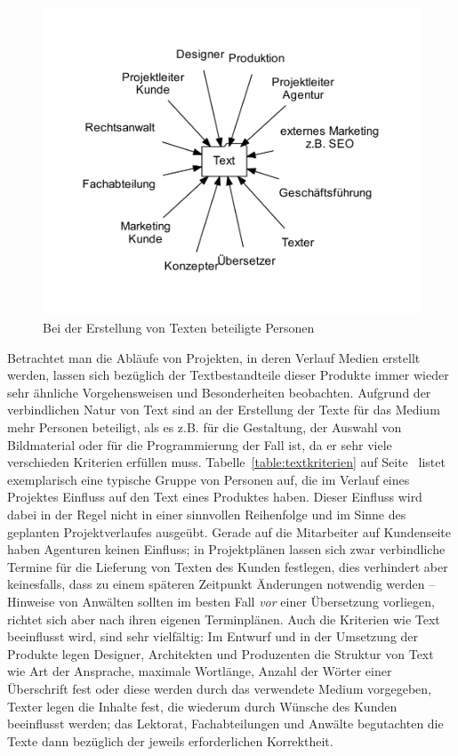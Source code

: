 \begin{figure}[htb]
\begin{center}
\includegraphics[width=\textwidth]{media/chart-2.pdf}
\end{center}
\caption{Bei der Erstellung von Texten beteiligte Personen}
\label{chart:2}
\end{figure}

Betrachtet man die Abläufe von Projekten, in deren Verlauf Medien erstellt werden, lassen sich bezüglich der Textbestandteile dieser Produkte immer wieder sehr ähnliche Vorgehensweisen und Besonderheiten beobachten. Aufgrund der verbindlichen Natur von Text sind an der Erstellung der Texte für das Medium mehr Personen beteiligt, als es z.B. für die Gestaltung, der Auswahl von Bildmaterial oder für die Programmierung der Fall ist,  da er sehr viele verschieden Kriterien erfüllen muss. Tabelle~\ref{table:textkriterien} auf Seite~\pageref{table:textkriterien} listet exemplarisch eine typische Gruppe von Personen auf, die im Verlauf eines Projektes Einfluss auf den Text eines Produktes haben. Dieser Einfluss wird dabei in der Regel nicht in einer sinnvollen Reihenfolge und im Sinne des geplanten Projektverlaufes ausgeübt. Gerade auf die Mitarbeiter auf Kundenseite haben Agenturen keinen Einfluss; in Projektplänen lassen sich zwar verbindliche Termine für die Lieferung von Texten des Kunden festlegen, dies verhindert aber keinesfalls, dass zu einem späteren Zeitpunkt Änderungen notwendig werden – Hinweise von Anwälten sollten im besten Fall \emph{vor} einer Übersetzung vorliegen, richtet sich aber nach ihren eigenen Terminplänen. Auch die Kriterien wie Text beeinflusst wird, sind sehr vielfältig: Im Entwurf und in der Umsetzung der Produkte legen Designer, Architekten und Produzenten die Struktur von Text wie Art der Ansprache, maximale Wortlänge, Anzahl der Wörter einer Überschrift fest oder diese werden durch das verwendete Medium vorgegeben, Texter legen die Inhalte fest, die wiederum durch Wünsche des Kunden beeinflusst werden; das Lektorat, Fachabteilungen und Anwälte begutachten die Texte dann bezüglich der jeweils erforderlichen Korrektheit.

